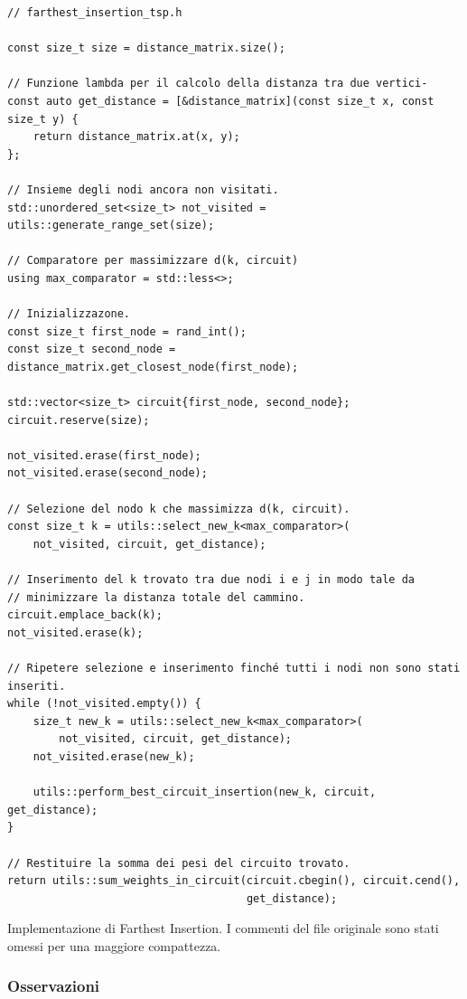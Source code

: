 \begin{listing}[!ht]
\begin{verbatim}
// farthest_insertion_tsp.h

const size_t size = distance_matrix.size();

// Funzione lambda per il calcolo della distanza tra due vertici-
const auto get_distance = [&distance_matrix](const size_t x, const size_t y) {
    return distance_matrix.at(x, y);
};

// Insieme degli nodi ancora non visitati.
std::unordered_set<size_t> not_visited = utils::generate_range_set(size);

// Comparatore per massimizzare d(k, circuit)
using max_comparator = std::less<>;

// Inizializzazone.
const size_t first_node = rand_int();
const size_t second_node = distance_matrix.get_closest_node(first_node);

std::vector<size_t> circuit{first_node, second_node};
circuit.reserve(size);

not_visited.erase(first_node);
not_visited.erase(second_node);

// Selezione del nodo k che massimizza d(k, circuit).
const size_t k = utils::select_new_k<max_comparator>(
    not_visited, circuit, get_distance);

// Inserimento del k trovato tra due nodi i e j in modo tale da
// minimizzare la distanza totale del cammino.
circuit.emplace_back(k);
not_visited.erase(k);

// Ripetere selezione e inserimento finché tutti i nodi non sono stati inseriti.
while (!not_visited.empty()) {
    size_t new_k = utils::select_new_k<max_comparator>(
        not_visited, circuit, get_distance);
    not_visited.erase(new_k);

    utils::perform_best_circuit_insertion(new_k, circuit, get_distance);
}

// Restituire la somma dei pesi del circuito trovato.
return utils::sum_weights_in_circuit(circuit.cbegin(), circuit.cend(),
                                     get_distance);
\end{verbatim}
\caption{Implementazione di Farthest Insertion. I commenti del file originale sono stati omessi per una maggiore compattezza.}
\label{listing:farthest-insertion}
\end{listing}

\subsubsection{Osservazioni}


